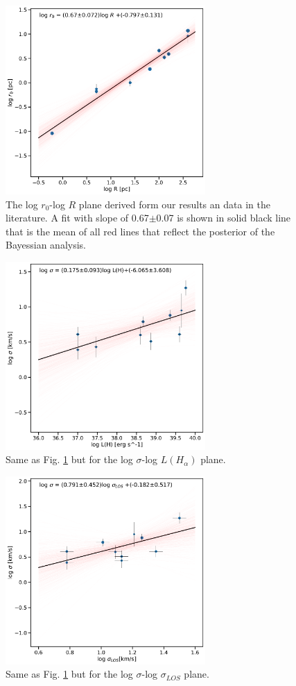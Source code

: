 \documentclass[fleqn,usenatbib, useAMS, a4paper]{mnras}
\begin{document}


\begin{figure}
\centering 
\includegraphics[width=3in]{Figures/rvsR}
\caption{The log $r_0$-log $R$ plane derived form our results an data in the literature. A fit with slope of 0.67$\pm$0.07 is shown in solid black line that is the mean of all red lines that reflect the posterior of the Bayessian analysis. }
\label{fig:rvsR}
\end{figure}

\begin{figure}
\centering 
\includegraphics[width=3in]{Figures/svsL}
\caption{Same as Fig. \ref{fig:rvsR} but for the log $\sigma$-log $L(H_{\alpha})$ plane.}
\label{fig:sigvsl}
\end{figure}

\begin{figure}
\centering 
\includegraphics[width=3in]{Figures/svss.pdf}
\caption{Same as Fig. \ref{fig:rvsR} but for the log $\sigma$-log $\sigma_{LOS}$ plane.}
\label{fig:svss}
\end{figure}
\end{document}
